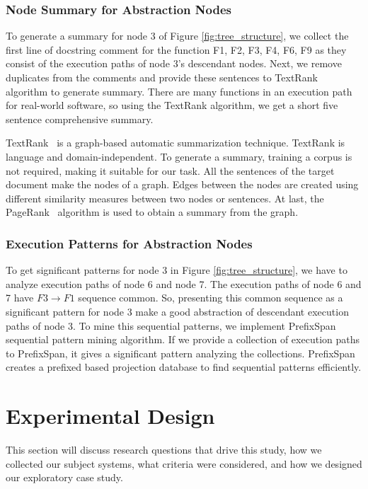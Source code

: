 \subsubsection{Node Summary for Abstraction Nodes}
To generate a summary for node 3 of Figure \ref{fig:tree_structure}, we collect the first line of docstring comment for the function F1, F2, F3, F4, F6, F9 as they consist of the execution paths of node 3's descendant nodes. Next, we remove duplicates from the comments and provide these sentences to TextRank \cite{barrios2016variationsTextRankSummarization} algorithm to generate summary. There are many functions in an execution path for real-world software, so using the TextRank algorithm, we get a short five sentence comprehensive summary. 

TextRank~\cite{barrios2016variationsTextRankSummarization} is a graph-based automatic summarization technique. TextRank is language and domain-independent. To generate a summary, training a corpus is not required, making it suitable for our task. All the sentences of the target document make the nodes of a graph. Edges between the nodes are created using different similarity measures between two nodes or sentences. At last, the PageRank~\cite{page1999pagerank} algorithm is used to obtain a summary from the graph.

\subsubsection{Execution Patterns for Abstraction Nodes}
To get significant patterns for node 3 in Figure \ref{fig:tree_structure}, we have to analyze execution paths of node 6 and node 7. The execution paths of node 6 and 7 have $ F3 \rightarrow  F1 $ sequence common. So, presenting this common sequence as a significant pattern for node 3 make a good abstraction of descendant execution paths of node 3. To mine this sequential patterns, we implement PrefixSpan \cite{han2001prefixspanSequentialPatterns} sequential pattern mining algorithm. If we provide a collection of execution paths to PrefixSpan, it gives a significant pattern analyzing the collections. PrefixSpan creates a prefixed based projection database to find sequential patterns efficiently.

\section{Experimental Design}
\label{hla2:evaluation}
This section will discuss research questions that drive this study, how we collected our subject systems, what criteria were considered, and how we designed our exploratory case study. 

